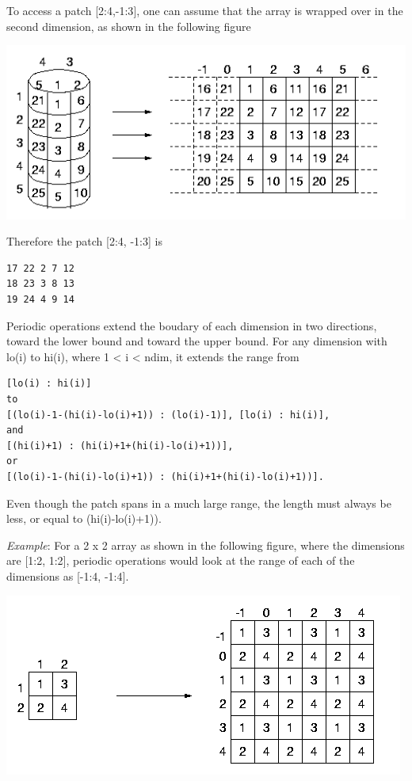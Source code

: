 To access a patch {[}2:4,-1:3{]}, one can assume that the array is
wrapped over in the second dimension, as shown in the following figure 

\includegraphics[scale=0.7]{periodic2}

Therefore the patch [2:4, -1:3] is
\begin{verbatim}
17 22 2 7 12
18 23 3 8 13
19 24 4 9 14
\end{verbatim}
Periodic operations extend the boudary of each dimension in two directions,
toward the lower bound and toward the upper bound. For any dimension
with lo(i) to hi(i), where 1 < i < ndim, it extends the range from 
\begin{lstlisting}[style=cppnoframe]
[lo(i) : hi(i)]
to
[(lo(i)-1-(hi(i)-lo(i)+1)) : (lo(i)-1)], [lo(i) : hi(i)],
and
[(hi(i)+1) : (hi(i)+1+(hi(i)-lo(i)+1))],
or
[(lo(i)-1-(hi(i)-lo(i)+1)) : (hi(i)+1+(hi(i)-lo(i)+1))].
\end{lstlisting}

Even though the patch spans in a much large range, the length must
always be less, or equal to (hi(i)-lo(i)+1)).

\emph{Example}: For a 2 x 2 array as shown in the following figure,
where the dimensions are {[}1:2, 1:2{]}, periodic operations would
look at the range of each of the dimensions as {[}-1:4, -1:4{]}.

\includegraphics[scale=0.7]{periodic3}


